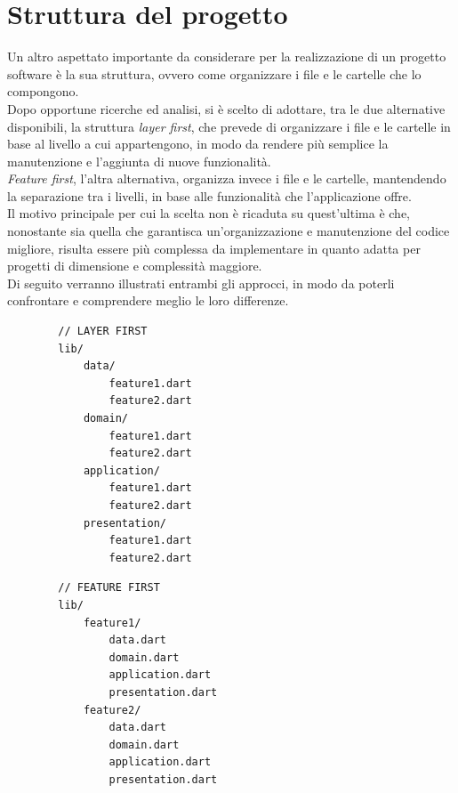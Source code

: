 \section{Struttura del progetto}
\label{sec:struttura-progetto}
Un altro aspettato importante da considerare per la realizzazione di un progetto software è la sua struttura, ovvero come organizzare i file e le cartelle che lo compongono.\\
Dopo opportune ricerche ed analisi, si è scelto di adottare, tra le due alternative disponibili, la struttura \emph{layer first}\cite{site:project-structure}, che prevede di organizzare i file e le cartelle in base al livello a cui appartengono, in modo da rendere più semplice la manutenzione e l'aggiunta di nuove funzionalità.\\
\emph{Feature first}, l'altra alternativa, organizza invece i file e le cartelle, mantendendo la separazione tra i livelli, in base alle funzionalità che l'applicazione offre.\\
Il motivo principale per cui la scelta non è ricaduta su quest'ultima è che, nonostante sia quella che garantisca un'organizzazione e manutenzione del codice migliore, risulta essere più complessa da implementare in quanto adatta per progetti di dimensione e complessità maggiore.\\
Di seguito verranno illustrati entrambi gli approcci, in modo da poterli confrontare e comprendere meglio le loro differenze.\\
\begin{multicols}{2}
    \begin{verbatim}
        // LAYER FIRST
        lib/
            data/
                feature1.dart
                feature2.dart
            domain/
                feature1.dart
                feature2.dart
            application/
                feature1.dart
                feature2.dart
            presentation/
                feature1.dart
                feature2.dart
    \end{verbatim}
    \begin{verbatim}
        // FEATURE FIRST
        lib/
            feature1/
                data.dart
                domain.dart
                application.dart
                presentation.dart
            feature2/
                data.dart
                domain.dart
                application.dart
                presentation.dart
    \end{verbatim}
\end{multicols}

